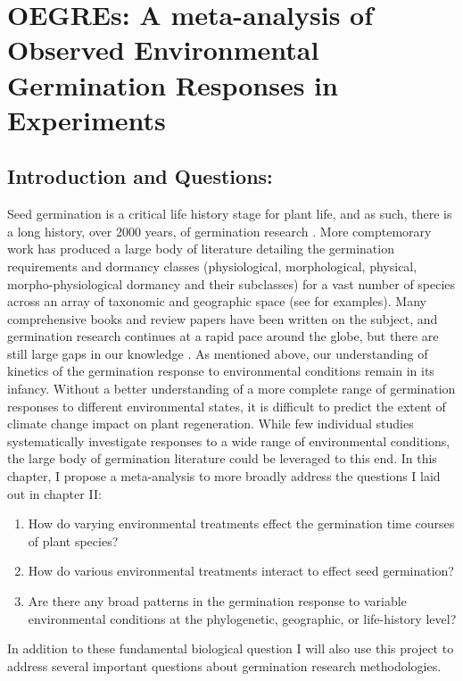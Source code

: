 \documentclass{article}\usepackage[]{graphicx}\usepackage[]{color}
\begin{document}
\section*{OEGREs: A meta-analysis of Observed Environmental Germination Responses in Experiments}
\subsection*{Introduction and Questions:}
\indent\indent Seed germination is a critical life history stage for plant life, and as such, there is a long history, over 2000 years, of germination research \citep{Baskin2014, Fenner2000}. More comptemorary work has produced a large body of literature detailing the germination requirements and dormancy classes (physiological, morphological, physical, morpho-physiological dormancy and their subclasses) for a vast number of species across an array of taxonomic and geographic space (see \citet{Baskin2014} for examples). Many comprehensive books and review papers have been written on the subject, and germination research continues at a rapid pace around the globe, but there are still large gaps in our knowledge \citep{Baskin2014}. As mentioned above, our understanding of  kinetics of the germination response to environmental conditions remain in its infancy.  Without a better understanding of a more complete range of germination responses to different environmental states, it is difficult to predict the extent of climate change impact on plant regeneration. While few individual studies systematically investigate responses to a wide range of environmental conditions, the large body of germination literature could be leveraged to this end. In this chapter, I propose a meta-analysis to more broadly address the questions I laid out in chapter II:
\begin{enumerate}
\item How do varying environmental treatments effect the germination time courses of plant species?
\item How do various environmental treatments interact to effect seed germination?
\item Are there any broad patterns in the germination response to variable environmental conditions at the phylogenetic, geographic, or life-history level?
\end{enumerate}
\indent\indent In addition to these fundamental biological question I will also use this project to address several important questions about germination research methodologies.
\end{document}
